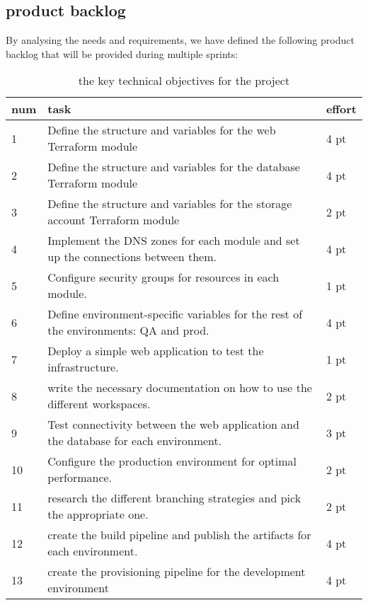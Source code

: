 \subsection{product backlog}
By analysing the needs and requirements, we have defined the following product backlog that will be provided during multiple sprints:
\begin{longtable}[c]{
    |p{}
    |p{}|
    p{}|
    }
    \caption{the key technical objectives for the project}
    \label{tab:productBacklog}                      \\
    \hline

    num
     & task
     & effort                                   \\
    \hline

    1 & Define the structure and variables for the web Terraform module & 4 pt \\ \hline
    2 & Define the structure and variables for the database Terraform module & 4 pt \\ \hline
    3 & Define the structure and variables for the storage account Terraform module & 2 pt \\ \hline
    4 & Implement the DNS zones for each module and set up the connections between them. & 4 pt \\ \hline
    5 & Configure security groups for resources in each module. & 1 pt \\ \hline
    6 & Define environment-specific variables for the rest of the environments: QA and prod. & 4 pt \\ \hline
    7 & Deploy a simple web application to test the infrastructure. & 1 pt \\ \hline
    8 & write the necessary documentation on how to use the different workspaces. & 2 pt \\ \hline
    9 & Test connectivity between the web application and the database for each environment. & 3 pt \\ \hline
    10 & Configure the production environment for optimal performance. & 2 pt \\ \hline
    11 & research the different branching strategies and pick the appropriate one. & 2 pt \\ \hline
    12 & create the build pipeline and publish the artifacts for each environment. & 4 pt \\ \hline
    13 & create the provisioning pipeline for the development environment & 4 pt \\ \hline

\end{longtable}
